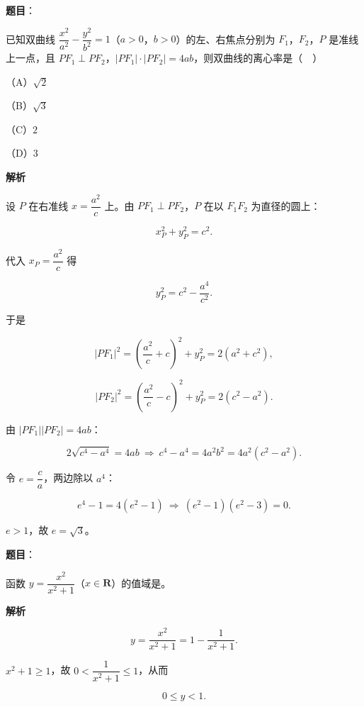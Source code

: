 \begin{answer}

\textbf{题目}：

已知双曲线 $\dfrac{x^2}{a^2}-\dfrac{y^2}{b^2}=1$（$a>0$，$b>0$）的左、右焦点分别为 $F_1$，$F_2$，$P$ 是准线上一点，且 $PF_1\perp PF_2$，$|PF_1|\cdot|PF_2|=4ab$，则双曲线的离心率是（　）

（A）$\sqrt2$

（B）$\sqrt3$

（C）$2$

（D）$3$

\textbf{解析}

设 $P$ 在右准线 $x=\dfrac{a^2}{c}$ 上。由 $PF_1\perp PF_2$，$P$ 在以 $F_1F_2$ 为直径的圆上：

\nopagebreak[4]
\[x_P^2+y_P^2=c^2.\]

代入 $x_P=\dfrac{a^2}{c}$ 得

\nopagebreak[4]
\[y_P^2=c^2-\frac{a^4}{c^2}.\]

于是

\nopagebreak[4]
\[|PF_1|^2=\left(\frac{a^2}{c}+c\right)^2+y_P^2=2(a^2+c^2),\]

\nopagebreak[4]
\[|PF_2|^2=\left(\frac{a^2}{c}-c\right)^2+y_P^2=2(c^2-a^2).\]

由 $|PF_1||PF_2|=4ab$：

\nopagebreak[4]
\[2\sqrt{c^4-a^4}=4ab\ \Rightarrow\ c^4-a^4=4a^2b^2=4a^2(c^2-a^2).\]

令 $e=\dfrac ca$，两边除以 $a^4$：

\nopagebreak[4]
\[e^4-1=4(e^2-1)\ \Rightarrow\ (e^2-1)(e^2-3)=0.\]

$e>1$，故 $e=\sqrt3$。


\end{answer}
\begin{answer}

\textbf{题目}：

函数 $y=\dfrac{x^2}{x^2+1}$（$x\in\mathbf R$）的值域是\gkblank{}。

\textbf{解析}

\nopagebreak[4]
\[y=\frac{x^2}{x^2+1}=1-\frac1{x^2+1}.\]

$x^2+1\geqslant1$，故 $0<\dfrac1{x^2+1}\leqslant1$，从而

\nopagebreak[4]
\[0\leqslant y<1.\]

\gkanswer{答案：$[0,1)$。}

\end{answer}
